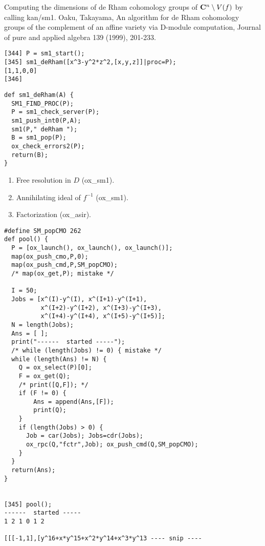\documentclass{slides}
\begin{document}
Computing the dimensions of de Rham cohomology groups
of ${\bf C}^n \setminus V(f)$ by calling kan/sm1.
{\footnotesize
 Oaku, Takayama, An algorithm for de Rham cohomology groups of the
  complement of an affine variety via D-module computation,
  Journal of pure and applied algebra 139 (1999), 201-233.}
\begin{verbatim}
[344] P = sm1_start();
[345] sm1_deRham([x^3-y^2*z^2,[x,y,z]]|proc=P);
[1,1,0,0]
[346] 
\end{verbatim}
{\footnotesize
\begin{verbatim}
def sm1_deRham(A) {
  SM1_FIND_PROC(P);
  P = sm1_check_server(P);
  sm1_push_int0(P,A);
  sm1(P," deRham ");
  B = sm1_pop(P);
  ox_check_errors2(P);
  return(B);
}
\end{verbatim}
}

\begin{enumerate}
\item Free resolution in $D$ (ox\_sm1).
\item Annihilating ideal of $f^{-1}$ (ox\_sm1).
\item Factorization  (ox\_asir).
\end{enumerate}

\newpage

{\footnotesize \begin{verbatim}
#define SM_popCMO 262
def pool() {
  P = [ox_launch(), ox_launch(), ox_launch()];
  map(ox_push_cmo,P,0);
  map(ox_push_cmd,P,SM_popCMO);
  /* map(ox_get,P); mistake */

  I = 50;
  Jobs = [x^(I)-y^(I), x^(I+1)-y^(I+1),
          x^(I+2)-y^(I+2), x^(I+3)-y^(I+3),
          x^(I+4)-y^(I+4), x^(I+5)-y^(I+5)];
  N = length(Jobs);
  Ans = [ ];
  print("------  started -----");
  /* while (length(Jobs) != 0) { mistake */
  while (length(Ans) != N) {
    Q = ox_select(P)[0];
    F = ox_get(Q);
    /* print([Q,F]); */
    if (F != 0) {
        Ans = append(Ans,[F]); 
        print(Q);
    }
    if (length(Jobs) > 0) {
      Job = car(Jobs); Jobs=cdr(Jobs);
      ox_rpc(Q,"fctr",Job); ox_push_cmd(Q,SM_popCMO);
    }
  }
  return(Ans);
}


[345] pool();
------  started -----
1 2 1 0 1 2

[[[-1,1],[y^16+x*y^15+x^2*y^14+x^3*y^13 ---- snip ----

\end{verbatim}}
\newpage

 \\
\end{document}
